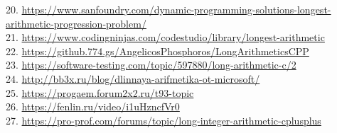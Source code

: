 \documentclass[a4paper]{article}
\begin{document}
\begin{flushleft}
20. \url{https://www.sanfoundry.com/dynamic-programming-solutions-longest-arithmetic-progression-problem/}\\
21. \url{https://www.codingninjas.com/codestudio/library/longest-arithmetic}\\
22. \url{https://github.774.gs/AngelicosPhosphoros/LongArithmeticsCPP}\\
23. \url{https://software-testing.com/topic/597880/long-arithmetic-c/2}\\
24. \url{http://bb3x.ru/blog/dlinnaya-arifmetika-ot-microsoft/}\\
25. \url{https://progaem.forum2x2.ru/t93-topic}\\
26. \url{https://fenlin.ru/video/i1uHzncfVr0}\\
27. \url{https://pro-prof.com/forums/topic/long-integer-arithmetic-cplusplus}\\
\end{flushleft}
\end{document}
